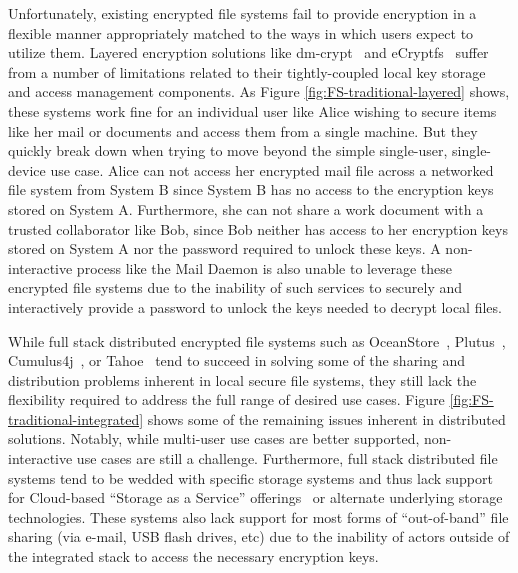 Unfortunately, existing encrypted file systems fail to provide
encryption in a flexible manner appropriately matched to the ways in
which users expect to utilize them. Layered encryption solutions like
dm-crypt~\cite{dm-crypt} and eCryptfs~\cite{eCryptfs, Halcrow} suffer
from a number of limitations related to their tightly-coupled local
key storage and access management components. As Figure
\ref{fig:FS-traditional-layered} shows, these systems work fine for an
individual user like Alice wishing to secure items like her mail or
documents and access them from a single machine. But they quickly
break down when trying to move beyond the simple single-user,
single-device use case. Alice can not access her encrypted mail file
across a networked file system from System B since System B has no
access to the encryption keys stored on System A. Furthermore, she can
not share a work document with a trusted collaborator like Bob, since
Bob neither has access to her encryption keys stored on System A nor
the password required to unlock these keys. A non-interactive process
like the Mail Daemon is also unable to leverage these encrypted file
systems due to the inability of such services to securely and
interactively provide a password to unlock the keys needed to decrypt
local files.

While full stack distributed encrypted file systems such as
OceanStore~\cite{Kubiatowicz2000}, Plutus~\cite{Kallahalla2003},
Cumulus4j~\cite{cumulus4j}, or Tahoe~\cite{Wilcox-O'Hearn2008} tend to
succeed in solving some of the sharing and distribution problems
inherent in local secure file systems, they still lack the flexibility
required to address the full range of desired use cases. Figure
\ref{fig:FS-traditional-integrated} shows some of the remaining issues
inherent in distributed solutions. Notably, while multi-user use cases
are better supported, non-interactive use cases are still a
challenge. Furthermore, full stack distributed file systems tend to be
wedded with specific storage systems and thus lack support for
Cloud-based ``Storage as a Service'' offerings~\cite{amazon-s3} or
alternate underlying storage technologies. These systems also lack
support for most forms of ``out-of-band'' file sharing (via e-mail,
USB flash drives, etc) due to the inability of actors outside of the
integrated stack to access the necessary encryption keys.

